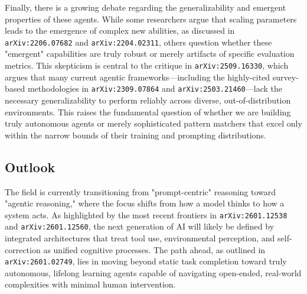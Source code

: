 \documentclass[11pt]{article}
\begin{document}
Finally, there is a growing debate regarding the generalizability and emergent properties of these agents. While some researchers argue that scaling parameters leads to the emergence of complex new abilities, as discussed in \texttt{arXiv:2206.07682} and \texttt{arXiv:2204.02311}, others question whether these "emergent" capabilities are truly robust or merely artifacts of specific evaluation metrics. This skepticism is central to the critique in \texttt{arXiv:2509.16330}, which argues that many current agentic frameworks—including the highly-cited survey-based methodologies in \texttt{arXiv:2309.07864} and \texttt{arXiv:2503.21460}—lack the necessary generalizability to perform reliably across diverse, out-of-distribution environments. This raises the fundamental question of whether we are building truly autonomous agents or merely sophisticated pattern matchers that excel only within the narrow bounds of their training and prompting distributions.

\subsection{Outlook}

The field is currently transitioning from "prompt-centric" reasoning toward "agentic reasoning," where the focus shifts from how a model thinks to how a system acts. As highlighted by the most recent frontiers in \texttt{arXiv:2601.12538} and \texttt{arXiv:2601.12560}, the next generation of AI will likely be defined by integrated architectures that treat tool use, environmental perception, and self-correction as unified cognitive processes. The path ahead, as outlined in \texttt{arXiv:2601.02749}, lies in moving beyond static task completion toward truly autonomous, lifelong learning agents capable of navigating open-ended, real-world complexities with minimal human intervention.
\end{document}

